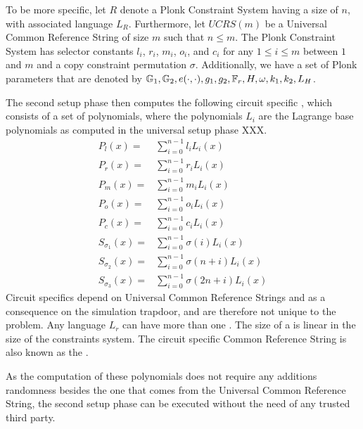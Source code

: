 To be more specific, let $R$ denote a Plonk Constraint System having a size of $n$, with associated language $L_R$. Furthermore, let $UCRS(m)$ be a Universal Common Reference String of size $m$ such that $n\leq m$. The Plonk Constraint System has selector constants $l_i$, $r_i$, $m_i$, $o_i$, and $c_i$ for any $1\leq i \leq m$ between $1$ and $m$ and a copy constraint permutation $\sigma$. Additionally, we have a set of Plonk parameters that are denoted by ${\mathbb{G}_1, \mathbb{G}_2, e(\cdot,\cdot), g_1, g_2, \mathbb{F}_r, H, \omega, k_1, k_2, L_H}$.

The second setup phase then computes the following circuit specific , which consists of a set of polynomials, where the polynomials $L_i$ are the Lagrange base polynomials as computed in the universal setup phase XXX.
\begin{equation}
\label{def:plonk-circuit-crs}
\begin{array}{rl}
P_{l}(x) = &\sum_{i=0}^{n-1} {l_i}L_i(x)\\
P_{r}(x) = &\sum_{i=0}^{n-1} {r_i}L_i(x)\\
P_{m}(x) = &\sum_{i=0}^{n-1} {m_i}L_i(x)\\
P_{o}(x) = &\sum_{i=0}^{n-1} {o_i}L_i(x)\\
P_{c}(x) = &\sum_{i=0}^{n-1} {c_i}L_i(x)\\
S_{\sigma_1}(x) =& \sum_{i=0}^{n-1} \sigma(i)L_i(x)\\
S_{\sigma_2}(x) =& \sum_{i=0}^{n-1} \sigma(n+i)L_i(x)\\
S_{\sigma_3}(x) =& \sum_{i=0}^{n-1} \sigma(2n+i)L_i(x)
\end{array}
\end{equation}
Circuit specifics depend on Universal Common Reference Strings and as a consequence on the simulation trapdoor, and are therefore not unique to the problem. Any language $L_r$ can have more than one . The  size of a  is linear in the size of the constraints system. The circuit specific Common Reference String is also known as the .

As the computation of these polynomials does not require any additions randomness besides the one that comes from the Universal Common Reference String, the second setup phase can be executed without the need of any trusted third party.

